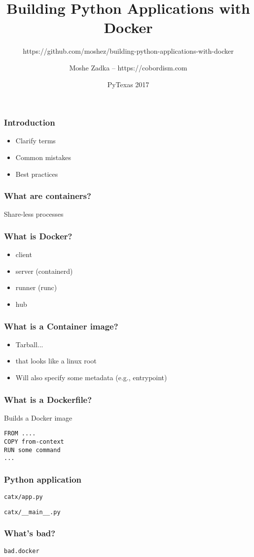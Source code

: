 \documentclass{beamer}
\title{Building Python Applications with Docker}
\subtitle{https://github.com/moshez/building-python-applications-with-docker}
\author{Moshe Zadka -- https://cobordism.com}
\date{PyTexas 2017}
\begin{document}
 
\frame{\titlepage}

\begin{frame}
\frametitle{Introduction}
\begin{itemize}
\item Clarify terms \pause
\item Common mistakes \pause
\item Best practices
\end{itemize}
\end{frame}

\begin{frame}[fragile]
\frametitle{What are containers?}
Share-less processes
\end{frame}

\begin{frame}[fragile]
\frametitle{What is Docker?}
\begin{itemize}
\item client \pause
\item server (containerd) \pause
\item runner (runc) \pause
\item hub
\end{itemize}
\end{frame}

\begin{frame}[fragile]
\frametitle{What is a Container image?}
\begin{itemize}
\item Tarball... \pause
\item that looks like a linux root \pause
\item Will also specify some metadata (e.g., entrypoint)
\end{itemize}
\end{frame}

\begin{frame}[fragile]
\frametitle{What is a Dockerfile?}
Builds a Docker image
\begin{lstlisting}
FROM ....
COPY from-context
RUN some command
...
\end{lstlisting}
\end{frame}

\begin{frame}[fragile]
\frametitle{Python application}
\verb|catx/app.py|

\verb|catx/__main__.py|

\end{frame}

\begin{frame}[fragile]
\frametitle{What's bad?}
\verb|bad.docker|

\end{frame}
\end{document}
